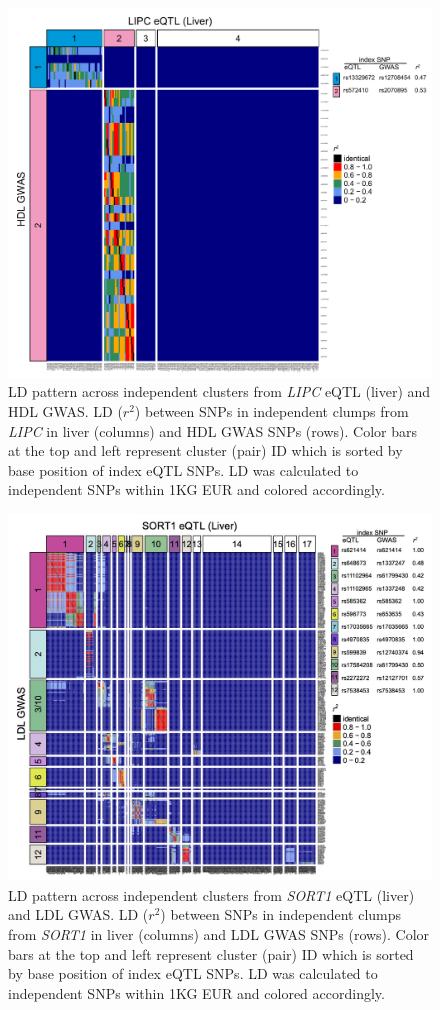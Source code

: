 \documentclass[11pt]{article}
\begin{document}
\begin{figure}[!ht]
  \centering
  \includegraphics[width=.7\textwidth]{figs/heatmap_lipc}
  \caption{LD pattern across independent clusters from \emph{LIPC}
    eQTL (liver) and HDL GWAS. LD ($r^2$) between SNPs in independent
    clumps from \emph{LIPC} in liver (columns) and HDL GWAS SNPs
    (rows). Color bars at the top and left represent cluster (pair) ID
    which is sorted by base position of index eQTL SNPs. LD was
    calculated to independent SNPs within 1KG EUR and colored
    accordingly.} 
\end{figure}

\begin{figure}[!ht]
  \centering
  \includegraphics[width=.7\textwidth]{figs/heatmap_sort1.jpg}
  \caption{LD pattern across independent clusters from \emph{SORT1}
    eQTL (liver) and LDL GWAS. LD ($r^2$) between SNPs in independent
    clumps from \emph{SORT1} in liver (columns) and LDL GWAS SNPs
    (rows). Color bars at the top and left represent cluster (pair) ID
    which is sorted by base position of index eQTL SNPs. LD was
    calculated to independent SNPs within 1KG EUR and colored
    accordingly.}
\end{figure}
\end{document}
